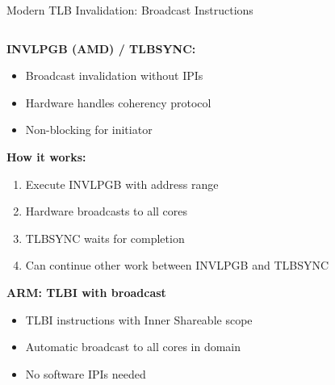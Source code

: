 \documentclass[aspectratio=169,12pt]{beamer}
\begin{document}
\begin{frame}{Modern TLB Invalidation: Broadcast Instructions}
\begin{columns}[T]
\begin{column}{0.55\textwidth}
\textbf{INVLPGB (AMD) / TLBSYNC:}
\begin{itemize}
\item Broadcast invalidation without IPIs
\item Hardware handles coherency protocol
\item Non-blocking for initiator
\end{itemize}

\textbf{How it works:}
\begin{enumerate}
\item Execute INVLPGB with address range
\item Hardware broadcasts to all cores
\item TLBSYNC waits for completion
\item Can continue other work between INVLPGB and TLBSYNC
\end{enumerate}

\textbf{ARM: TLBI with broadcast}
\begin{itemize}
\item TLBI instructions with Inner Shareable scope
\item Automatic broadcast to all cores in domain
\item No software IPIs needed
\end{itemize}
\end{column}

\begin{column}{0.45\textwidth}
\begin{center}
\end{center}
\end{column}
\end{columns}
\end{frame}
\end{document}
